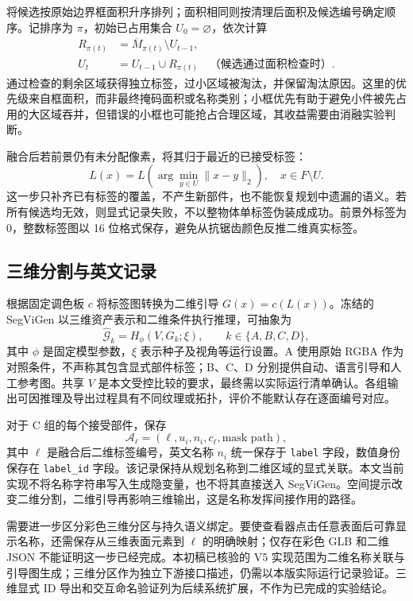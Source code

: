将候选按原始边界框面积升序排列；面积相同则按清理后面积及候选编号确定顺序。记排序为 $\pi$，初始已占用集合 $U_0=\varnothing$，依次计算
\begin{align}
 R_{\pi(t)}&=\overline M_{\pi(t)}\setminus U_{t-1},\\
 U_t&=U_{t-1}\cup R_{\pi(t)}\quad\text{（候选通过面积检查时）}.
 \label{eq:fusion}
\end{align}
通过检查的剩余区域获得独立标签，过小区域被淘汰，并保留淘汰原因。这里的优先级来自框面积，而非最终掩码面积或名称类别；小框优先有助于避免小件被先占用的大区域吞并，但错误的小框也可能抢占合理区域，其收益需要由消融实验判断。

融合后若前景仍有未分配像素，将其归于最近的已接受标签：
\begin{equation}
 L(x)=L\!\left(\arg\min_{y\in U}\|x-y\|_2\right),
 \quad x\in F\setminus U .
 \label{eq:residual}
\end{equation}
这一步只补齐已有标签的覆盖，不产生新部件，也不能恢复规划中遗漏的语义。若所有候选均无效，则显式记录失败，不以整物体单标签伪装成成功。前景外标签为 $0$，整数标签图以 16 位格式保存，避免从抗锯齿颜色反推二维真实标签。

\subsection{三维分割与英文记录}
根据固定调色板 $c$ 将标签图转换为二维引导 $G(x)=c(L(x))$。冻结的 SegViGen 以三维资产表示和二维条件执行推理，可抽象为
\begin{equation}
 \widehat{\mathcal{G}}_k=H_{\phi}(V,G_k;\xi),\qquad
 k\in\{A,B,C,D\},
 \label{eq:3d}
\end{equation}
其中 $\phi$ 是固定模型参数，$\xi$ 表示种子及视角等运行设置。A 使用原始 RGBA 作为对照条件，不声称其包含显式部件标签；B、C、D 分别提供自动、语言引导和人工参考图。共享 $V$ 是本文受控比较的要求，最终需以实际运行清单确认。各组输出可因推理及导出过程具有不同纹理或拓扑，评价不能默认存在逐面编号对应。

对于 C 组的每个接受部件，保存
\begin{equation}
 \mathcal{A}_{\ell}=(\ell,u_i,n_i,c_{\ell},\text{mask path}),
 \label{eq:annotation}
\end{equation}
其中 $\ell$ 是融合后二维标签编号，英文名称 $n_i$ 统一保存于 \texttt{label} 字段，数值身份保存在 \texttt{label\_id} 字段。该记录保持从规划名称到二维区域的显式关联。本文当前实现不将名称字符串写入生成隐变量，也不将其直接送入 SegViGen。空间提示改变二维分割，二维引导再影响三维输出，这是名称发挥间接作用的路径。

需要进一步区分彩色三维分区与持久语义绑定。要使查看器点击任意表面后可靠显示名称，还需保存从三维表面元素到 $\ell$ 的明确映射；仅存在彩色 GLB 和二维 JSON 不能证明这一步已经完成。本初稿已核验的 V5 实现范围为二维名称关联与引导图生成；三维分区作为独立下游接口描述，仍需以本版实际运行记录验证。三维显式 ID 导出和交互命名验证列为后续系统扩展，不作为已完成的实验结论。
